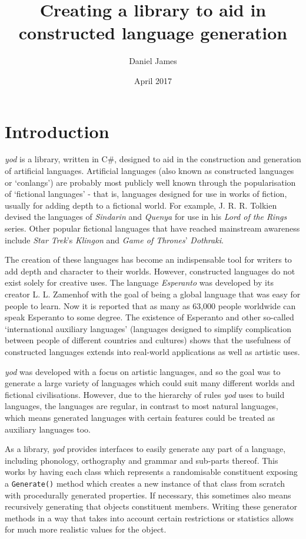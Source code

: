 \documentclass{report}
\title{Creating a library to aid in constructed language generation}
\author{Daniel James}
\date{April 2017}
\newcommand{\Csh}{C{\lserif\#}}
\begin{document}
   \maketitle
   
   \chapter{Introduction}
   \label{chapter: introduction}
   \textit{yod} is a library, written in \Csh{}, designed to aid in the construction and generation of artificial languages. Artificial languages (also known as constructed languages or `conlangs') are probably most publicly well known through the popularisation of `fictional languages' - that is, languages designed for use in works of fiction, usually for adding depth to a fictional world. For example, J. R. R. Tolkien devised the languages of \textit{Sindarin} and \textit{Quenya} for use in his \textit{Lord of the Rings} series. Other popular fictional languages that have reached mainstream awareness include \textit{Star Trek}'s \textit{Klingon} and \textit{Game of Thrones}' \textit{Dothraki}.
   
   The creation of these languages has become an indispensable tool for writers to add depth and character to their worlds. However, constructed languages do not exist solely for creative uses. The language \textit{Esperanto} was developed by its creator L. L. Zamenhof with the goal of being a global language that was easy for people to learn\cite{unualibro}. Now it is reported that as many as 63,000 people worldwide can speak Esperanto to some degree\cite{esperanto}. The existence of Esperanto and other so-called `international auxiliary languages' (languages designed to simplify complication between people of different countries and cultures) shows that the usefulness of constructed languages extends into real-world applications as well as artistic uses.
   
   \textit{yod} was developed with a focus on artistic languages, and so the goal was to generate a large variety of languages which could suit many different worlds and fictional civilisations. However, due to the hierarchy of rules \textit{yod} uses to build languages, the languages are regular, in contrast to most natural languages, which means generated languages with certain features could be treated as auxiliary languages too.
   
   As a library, \textit{yod} provides interfaces to easily generate any part of a language, including phonology, orthography and grammar and sub-parts thereof. This works by having each class which represents a randomisable constituent exposing a \texttt{Generate()} method which creates a new instance of that class from scratch with procedurally generated properties. If necessary, this sometimes also means recursively generating that objects constituent members. Writing these generator methods in a way that takes into account certain restrictions or statistics allows for much more realistic values for the object.
   
\end{document}
